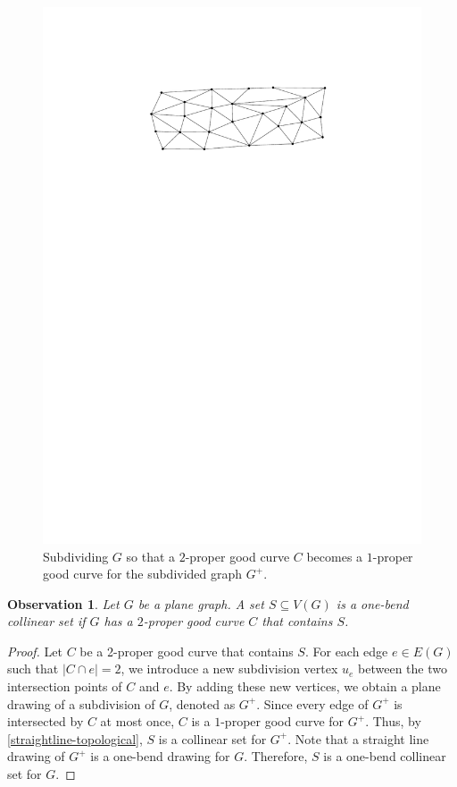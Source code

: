 \documentclass[a4paper,UKenglish,cleveref, autoref, thm-restate]{lipics-v2021}
\newtheorem{obs}{Observation}
\begin{document}
\begin{figure} [htbp]
  \includegraphics[page=7]{figs/proper_good}
  \caption{Subdividing $G$ so that a $2$-proper good curve $C$ becomes a $1$-proper good curve for the subdivided graph $G^+$.}
  \label{subdivisions}
\end{figure}

\begin{obs} \label{1-bend-topological}
    Let $G$ be a plane graph. A set $S \subseteq V(G)$ is a one-bend collinear set if $G$ has a $2$-proper good curve $C$ that contains $S$.
\end{obs}

\begin{proof}
Let $C$ be a 2-proper good curve that contains $S$. For each edge $e \in E(G)$ such that $|C \cap e| = 2$, we introduce a new subdivision vertex $u_e$ between the two intersection points of $C$ and $e$. By adding these new vertices, we obtain a plane drawing of a subdivision of $G$, denoted as $G^+$. Since every edge of $G^+$ is intersected by $C$ at most once, $C$ is a $1$-proper good curve for $G^+$. Thus, by \cref{straightline-topological}, $S$ is a collinear set for $G^+$. Note that a straight line drawing of $G^+$ is a one-bend drawing for $G$. Therefore, $S$ is a one-bend collinear set for $G$.
\end{proof}
\end{document}
